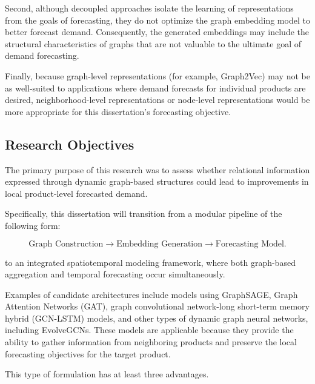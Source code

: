 Second, although decoupled approaches isolate the learning of representations from the goals of forecasting, they do not optimize the graph embedding model to better forecast demand. Consequently, the generated embeddings may include the structural characteristics of graphs that are not valuable to the ultimate goal of demand forecasting.

Finally, because graph-level representations (for example, Graph2Vec) may not be as well-suited to applications where demand forecasts for individual products are desired, neighborhood-level representations or node-level representations would be more appropriate for this dissertation's forecasting objective.

\subsection{Research Objectives} \label{subsec:research_objective}

The primary purpose of this research was to assess whether relational information expressed through dynamic graph-based structures could lead to improvements in local product-level forecasted demand.

Specifically, this dissertation will transition from a modular pipeline of the following form:

\begin{equation}
\text{Graph Construction} \rightarrow \text{Embedding Generation} \rightarrow \text{Forecasting Model}. \label{eq:modular_pipeline}
\end{equation}

to an integrated spatiotemporal modeling framework, where both graph-based aggregation and temporal forecasting occur simultaneously.

Examples of candidate architectures include models using GraphSAGE, Graph Attention Networks (GAT), graph convolutional network-long short-term memory hybrid (GCN-LSTM) models, and other types of dynamic graph neural networks, including EvolveGCNs. These models are applicable because they provide the ability to gather information from neighboring products and preserve the local forecasting objectives for the target product.

This type of formulation has at least three advantages.

